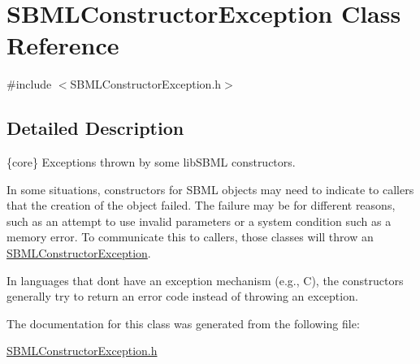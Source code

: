 \hypertarget{class_s_b_m_l_constructor_exception}{}\section{S\+B\+M\+L\+Constructor\+Exception Class Reference}
\label{class_s_b_m_l_constructor_exception}


{\ttfamily \#include $<$S\+B\+M\+L\+Constructor\+Exception.\+h$>$}



\subsection{Detailed Description}
\{core\} Exceptions thrown by some lib\+S\+B\+ML constructors.

In some situations, constructors for S\+B\+ML objects may need to indicate to callers that the creation of the object failed. The failure may be for different reasons, such as an attempt to use invalid parameters or a system condition such as a memory error. To communicate this to callers, those classes will throw an \hyperlink{class_s_b_m_l_constructor_exception}{S\+B\+M\+L\+Constructor\+Exception}.

In languages that don\textquotesingle{}t have an exception mechanism (e.\+g., C), the constructors generally try to return an error code instead of throwing an exception. 

The documentation for this class was generated from the following file\+:\begin{DoxyCompactItemize}
\item 
\hyperlink{_s_b_m_l_constructor_exception_8h}{S\+B\+M\+L\+Constructor\+Exception.\+h}\end{DoxyCompactItemize}
